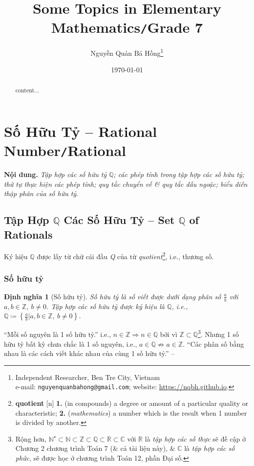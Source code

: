 \documentclass{article}
\title{Some Topics in Elementary Mathematics\texttt{/}Grade 7}
\author{Nguyễn Quản Bá Hồng\footnote{Independent Researcher, Ben Tre City, Vietnam\\e-mail: \texttt{nguyenquanbahong@gmail.com}; website: \url{https://nqbh.github.io}.}}
\date{\today}
\numberwithin{equation}{section}
\newtheorem{dinhnghia}{Định nghĩa}[section]
\begin{document}
\maketitle
\begin{abstract}
	content...
\end{abstract}
\setcounter{secnumdepth}{4}
\setcounter{tocdepth}{3}
\tableofcontents
\newpage


\section{Số Hữu Tỷ -- Rational Number\texttt{/}Rational}
\textbf{Nội dung.} \textit{Tập hợp các số hữu tỷ $\mathbb{Q}$; các phép tính trong tập hợp các số hữu tỷ; thứ tự thực hiện các phép tính; quy tắc chuyển vế \& quy tắc dấu ngoặc; biểu diễn thập phân của số hữu tỷ}.

\subsection{Tập Hợp $\mathbb{Q}$ Các Số Hữu Tỷ -- Set $\mathbb{Q}$ of Rationals}
Ký hiệu $\mathbb{Q}$ được lấy từ chữ cái đầu \textit{Q} của từ \textit{quotient}\footnote{\textbf{quotient} [n] \textbf{1.} (in compounds) a degree or amount of a particular quality or characteristic; \textbf{2.} (\textit{mathematics}) a number which is the result when 1 number is divided by another.}, i.e., thương số.

\subsubsection{Số hữu tỷ}

\begin{dinhnghia}[Số hữu tỷ]
	\emph{Số hữu tỷ} là số viết được dưới dạng phân số $\frac{a}{b}$ với $a,b\in\mathbb{Z}$, $b\ne 0$. \emph{Tập hợp các số hữu tỷ} được ký hiệu là $\mathbb{Q}$, i.e., $\mathbb{Q}\coloneqq\left\{\frac{a}{b}|a,b\in\mathbb{Z},\ b\ne 0\right\}$.
\end{dinhnghia}
``Mỗi số nguyên là 1 số hữu tỷ.'' i.e., $n\in\mathbb{Z}\Rightarrow n\in\mathbb{Q}$ bởi vì $\mathbb{Z}\subset\mathbb{Q}$\footnote{Rộng hơn, $\mathbb{N}^\star\subset\mathbb{N}\subset\mathbb{Z}\subset\mathbb{Q}\subset\mathbb{R}\subset\mathbb{C}$ với $\mathbb{R}$ là \textit{tập hợp các số thực} sẽ đề cập ở Chương 2 chương trình Toán 7 (\& cả tài liệu này), \& $\mathbb{C}$ là \textit{tập hợp các số phức}, sẽ được học ở chương trình Toán 12, phần Đại số.}. Nhưng 1 số hữu tỷ bất kỳ chưa chắc là 1 số nguyên, i.e., $a\in\mathbb{Q}\not\Rightarrow a\in\mathbb{Z}$. ``Các phân số bằng nhau là các cách viết khác nhau của cùng 1 số hữu tỷ.'' -- \cite[p. 6]{SGK_Toan_7_Canh_Dieu_tap_1}
\end{document}
